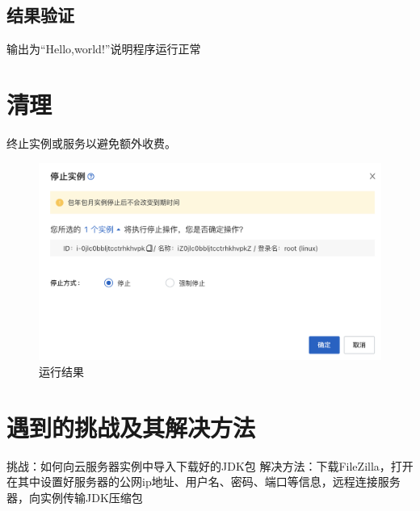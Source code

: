 \documentclass{article}
\begin{document}
\subsection{结果验证}
输出为“Hello,world!”说明程序运行正常

\newpage
\section{清理}
终止实例或服务以避免额外收费。

\begin{figure}[ht]
    \centering
    \includegraphics[width=\textwidth]{img/stop.png}
    \caption{运行结果}
    \label{fig:enter-label}
\end{figure}


\section{遇到的挑战及其解决方法}
挑战：如何向云服务器实例中导入下载好的JDK包
解决方法：下载FileZilla，打开在其中设置好服务器的公网ip地址、用户名、密码、端口等信息，远程连接服务器，向实例传输JDK压缩包
\end{document}
